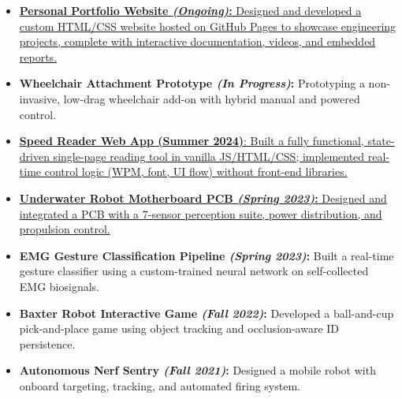 \documentclass[letterpaper,10pt]{article}
\newcommand{\experience}[5]{%
    \noindent\textbf{#1}%
    \ifx&#2&
    \else
        , \textit{#2}%
    \fi
    \ifx&#3&
    \else
        , #3%
    \fi
    \hfill \textit{#4} \\
    \vspace{-6.8mm}%
    \begin{itemize}[itemsep=-5pt]
        \setlength{\itemindent}{0em}
        #5
    \end{itemize}
    \vspace{1mm}
}
\begin{document}
\begin{itemize}
    \item \href{https://ryanbarry.me}{\textbf{Personal Portfolio Website \textit{(Ongoing)}:} Designed and developed a custom HTML/CSS website hosted on GitHub Pages to showcase engineering projects, complete with interactive documentation, videos, and embedded reports.}

    \item \textbf{Wheelchair Attachment Prototype \textit{(In Progress)}:} Prototyping a non-invasive, low-drag wheelchair add-on with hybrid manual and powered control.
    
    \item \href{https://ryanbarry.me/tools/speed-reader/}{\textbf{Speed Reader Web App (Summer 2024)}: Built a fully functional, state-driven single-page reading tool in vanilla JS/HTML/CSS; implemented real-time control logic (WPM, font, UI flow) without front-end libraries.}
    
    \item \href{https://ryanbarry.me/projects/electrical-engineering/underwater-robot/}{\textbf{Underwater Robot Motherboard PCB \textit{(Spring 2023)}:} Designed and integrated a PCB with a 7-sensor perception suite, power distribution, and propulsion control.}
    
    \item \textbf{EMG Gesture Classification Pipeline \textit{(Spring 2023)}:} Built a real-time gesture classifier using a custom-trained neural network on self-collected EMG biosignals.
    
    \item \textbf{Baxter Robot Interactive Game \textit{(Fall 2022)}:} Developed a ball-and-cup pick-and-place game using object tracking and occlusion-aware ID persistence.
    
    \item \textbf{Autonomous Nerf Sentry \textit{(Fall 2021)}:} Designed a mobile robot with onboard targeting, tracking, and automated firing system.
\end{itemize}
        
\end{document}
